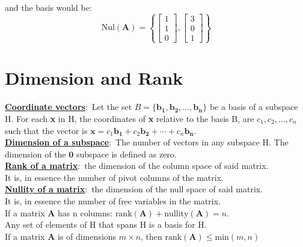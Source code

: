 \documentclass[nobib]{tufte-handout}
\newcommand{\defn}[2]{\underline{\noindent\textbf{#1}}:\ #2}
\begin{document}
and the basis would be:
\begin{equation*}
    \text{Nul}(\mathbf{A})=
    \left\{\begin{bmatrix}
        1 \\
        1 \\
        0
    \end{bmatrix},
    \begin{bmatrix}
        3 \\
        0 \\
        1
    \end{bmatrix}\right\}
\end{equation*}
\section{Dimension and Rank}
\defn{Coordinate vectors}{Let the set $B = \{\mathbf{b_1,b_2,\ldots,b_n}\}$ be a basis of a subspace H.
    For each \textbf{x} in H, the coordinates of \textbf{x} relative to the basis B, are $c_1,c_2,\ldots,c_n$ such that the vector is $\mathbf{x} = c_1\mathbf{b_1}+ c_2\mathbf{b_2}+\cdots+ c_n\mathbf{b_n}$.\\}
\defn{Dimension of a subspace}{The number of vectors in any subspace H. The dimension of the $\mathbf{0}$ subspace is defined as zero.\\}
\defn{Rank of a matrix}{the dimension of the column space of said matrix.}\\ It is, in essence the number of pivot columns of the matrix.\\
\defn{Nullity of a matrix}{the dimension of the null space of said matrix.}\\ It is, in essence the number of free variables in the matrix.\\
If a matrix \textbf{A} has n columns: $\text{rank}(\mathbf{A})+\text{nullity}(\mathbf{A})=n$.\\
Any set of elements of H that spans H is a basis for H.\\
If a matrix \textbf{A} is of dimensions $m\times n$, then $\text{rank}(\mathbf{A})\leq \text{min}(m,n)$\
\end{document}

